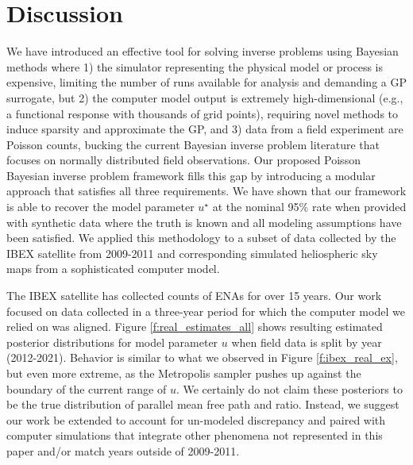 \documentclass[11pt]{article}
\begin{document}
\section{Discussion}
\label{sec:discuss}

We have introduced an effective tool for solving inverse problems using
Bayesian methods where 1) the simulator representing the physical model or
process is expensive, limiting the number of runs available for analysis and
demanding a GP surrogate, but 2) the computer model output is extremely
high-dimensional {\color{red}(e.g., a functional response with thousands of
grid points)}, requiring novel methods to induce sparsity and approximate the
GP, and 3) data from a field experiment are Poisson counts, bucking the
current Bayesian inverse problem literature that focuses on normally
distributed field observations. Our proposed Poisson Bayesian inverse problem
framework fills this gap by introducing a modular approach that satisfies all
three requirements. We have shown that our framework is able to recover the
model parameter $u^\star$ at the nominal 95\% rate when provided with
synthetic data where the truth is known and all modeling assumptions have been
satisfied. We applied this methodology to a subset of data collected by the
IBEX satellite from 2009-2011 and corresponding simulated heliospheric sky
maps from a sophisticated computer model.

The IBEX satellite has collected counts of ENAs for over 15 years. Our work
focused on data collected in a three-year period for which the computer model we
relied on was aligned. Figure \ref{f:real_estimates_all} shows resulting
estimated posterior distributions for model parameter $u$ when field data is
split by year (2012-2021). Behavior is similar to what we observed in Figure
\ref{f:ibex_real_ex}, but even more extreme, as the Metropolis sampler pushes up
against the boundary of the current range of $u$. We certainly do not claim
these posteriors to be the true distribution of parallel mean free path and
ratio. Instead, we suggest our work be extended to account for un-modeled
discrepancy and paired with computer simulations that integrate other phenomena
not represented in this paper and/or match years outside of 2009-2011.
\end{document}
